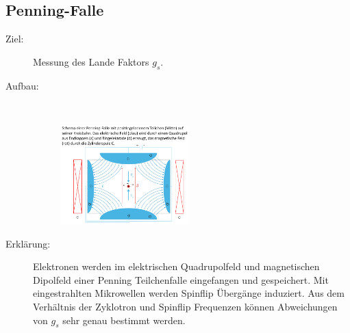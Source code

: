 \documentclass[twocolumn]{summery_4.1}
\begin{document}
\subsection{Penning-Falle}
\begin{description}
    \item[Ziel:] Messung des Lande Faktors \(g_s\). 
    
    \item[Aufbau:]\,
    
    \begin{figure}[H]
        \centering
        \includegraphics[width=0.49\textwidth]{Penning_Falle.png}
    \end{figure}
    
    \item[Erklärung:]
    Elektronen werden im elektrischen Quadrupolfeld und magnetischen Dipolfeld
    einer Penning Teilchenfalle eingefangen und gespeichert. Mit eingestrahlten Mikrowellen werden Spinflip Übergänge induziert.
    Aus dem Verhältnis der Zyklotron und Spinflip Frequenzen können Abweichungen von $g_s$ sehr genau bestimmt werden.
\end{description}
\end{document}
